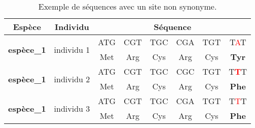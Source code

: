 \documentclass[../main]{subfiles} %
\begin{document}


\begin{table}[]
    \centering
    \begin{tabular}{cccccccc}
        \toprule
        \textbf{Espèce}                     & \textbf{Individu}             & \multicolumn{6}{c}{\textbf{Séquence}} \\
        \midrule
        \multirow{2}{*}{\textbf{espèce\_1}} & \multirow{2}{*}{individu 1}   & ATG  & CGT  & TGC  & CGA  & TGT & T\textcolor{red}{A}T \\
                                            &                               & Met  & Arg  & Cys  & Arg  & Cys  & \textbf{Tyr} \\
        \midrule
        \multirow{2}{*}{\textbf{espèce\_1}} & \multirow{2}{*}{individu 2}   & ATG  & CGT  & TGC  & CGC  & TGT & T\textcolor{red}{\textbf{T}}T \\
                                            &                               & Met  & Arg  & Cys  & Arg  & Cys  & \textbf{Phe} \\
        \midrule
        \multirow{2}{*}{\textbf{espèce\_1}} & \multirow{2}{*}{individu 3}   & ATG  & CGT  & TGC  & CGA  & TGT & T\textcolor{red}{T}T \\
                                            &                               & Met  & Arg  & Cys  & Arg  & Cys  & \textbf{Phe} \\
        \bottomrule
    \end{tabular}

    \caption{Exemple de séquences avec un site non synonyme.}
    \label{tab:seqEx3}
\end{table}
\end{document}
